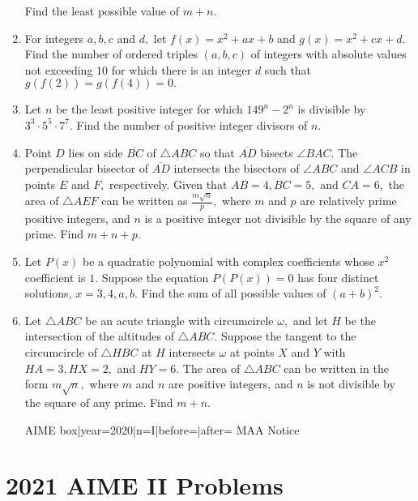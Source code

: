 \documentclass{article}
\begin{document}
\begin{enumerate}[label=\arabic*., itemsep=0.5em]
Find the least possible value of \(m+n.\)\par \vspace{0.5em}\item For integers \(a,b,c\) and \(d,\) let \(f(x)=x^2+ax+b\) and \(g(x)=x^2+cx+d.\) Find the number of ordered triples \((a,b,c)\) of integers with absolute values not exceeding \(10\) for which there is an integer \(d\) such that \(g(f(2))=g(f(4))=0.\)\par \vspace{0.5em}\item Let \(n\) be the least positive integer for which \(149^n-2^n\) is divisible by \(3^3\cdot5^5\cdot7^7.\) Find the number of positive integer divisors of \(n.\)\par \vspace{0.5em}\item Point \(D\) lies on side \(\overline{BC}\) of \(\triangle ABC\) so that \(\overline{AD}\) bisects \(\angle BAC.\) The perpendicular bisector of \(\overline{AD}\) intersects the bisectors of \(\angle ABC\) and \(\angle ACB\) in points \(E\) and \(F,\) respectively. Given that \(AB=4,BC=5,\) and \(CA=6,\) the area of \(\triangle AEF\) can be written as \(\tfrac{m\sqrt{n}}p,\) where \(m\) and \(p\) are relatively prime positive integers, and \(n\) is a positive integer not divisible by the square of any prime. Find \(m+n+p\).\par \vspace{0.5em}\item Let \(P(x)\) be a quadratic polynomial with complex coefficients whose \(x^2\) coefficient is \(1.\) Suppose the equation \(P(P(x))=0\) has four distinct solutions, \(x=3,4,a,b.\) Find the sum of all possible values of \((a+b)^2.\)\par \vspace{0.5em}\item Let \(\triangle ABC\) be an acute triangle with circumcircle \(\omega,\) and let \(H\) be the intersection of the altitudes of \(\triangle ABC.\) Suppose the tangent to the circumcircle of \(\triangle HBC\) at \(H\) intersects \(\omega\) at points \(X\) and \(Y\) with \(HA=3,HX=2,\) and \(HY=6.\) The area of \(\triangle ABC\) can be written in the form \(m\sqrt{n},\) where \(m\) and \(n\) are positive integers, and \(n\) is not divisible by the square of any prime. Find \(m+n.\)




{{AIME box|year=2020|n=I|before=|after=}}
{{MAA Notice}}\par \vspace{0.5em}\end{enumerate}\newpage\section*{2021 AIME II Problems}
\end{document}
